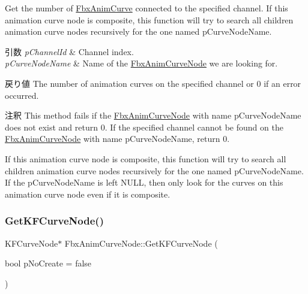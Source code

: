 Get the number of \hyperlink{class_fbx_anim_curve}{Fbx\+Anim\+Curve} connected to the specified channel. If this animation curve node is composite, this function will try to search all children animation curve nodes recursively for the one named p\+Curve\+Node\+Name. 
\begin{DoxyParams}{引数}
{\em p\+Channel\+Id} & Channel index. \\
\hline
{\em p\+Curve\+Node\+Name} & Name of the \hyperlink{class_fbx_anim_curve_node}{Fbx\+Anim\+Curve\+Node} we are looking for. \\
\hline
\end{DoxyParams}
\begin{DoxyReturn}{戻り値}
The number of animation curves on the specified channel or 0 if an error occurred. 
\end{DoxyReturn}
\begin{DoxyRemark}{注釈}
This method fails if the \hyperlink{class_fbx_anim_curve_node}{Fbx\+Anim\+Curve\+Node} with name p\+Curve\+Node\+Name does not exist and return 0. If the specified channel cannot be found on the \hyperlink{class_fbx_anim_curve_node}{Fbx\+Anim\+Curve\+Node} with name p\+Curve\+Node\+Name, return 0. 

If this animation curve node is composite, this function will try to search all children animation curve nodes recursively for the one named p\+Curve\+Node\+Name. If the p\+Curve\+Node\+Name is left N\+U\+LL, then only look for the curves on this animation curve node even if it is composite. 
\end{DoxyRemark}
\mbox{\label{class_fbx_anim_curve_node_a482d23e7517db05af3252b2c02ce2415}} 
\subsubsection{\texorpdfstring{Get\+K\+F\+Curve\+Node()}{GetKFCurveNode()}}
{\footnotesize\ttfamily K\+F\+Curve\+Node$\ast$ Fbx\+Anim\+Curve\+Node\+::\+Get\+K\+F\+Curve\+Node (\begin{DoxyParamCaption}\item[{bool}]{p\+No\+Create = {\ttfamily false} }\end{DoxyParamCaption})}

\mbox{\label{class_fbx_anim_curve_node_aef47daaf7f219b58537fcd4e40adee38}} 
